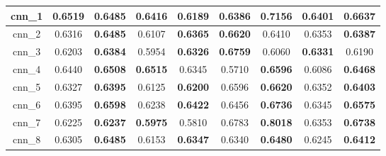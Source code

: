 \begin{table}[hp]
\begin{tabular} {|c|c|c|c|c|c|c|c|c| }
        cnn\_1   & \textbf{0.6519}                     & 0.6485                              & \textbf{0.6416}                     & 0.6189                              & 0.6386                              & \textbf{0.7156}                     & 0.6401                              & \textbf{0.6637}                     \\ \hline
        cnn\_2   & 0.6316                              & \textbf{0.6485}                     & 0.6107                              & \textbf{0.6365}                     & \textbf{0.6620}                     & 0.6410                              & 0.6353                              & \textbf{0.6387}                     \\ \hline
        cnn\_3   & 0.6203                              & \textbf{0.6384}                     & 0.5954                              & \textbf{0.6326}                     & \textbf{0.6759}                     & 0.6060                              & \textbf{0.6331}                     & 0.6190                              \\ \hline
        cnn\_4   & 0.6440                              & \textbf{0.6508}                     & \textbf{0.6515}                     & 0.6345                              & 0.5710                              & \textbf{0.6596}                     & 0.6086                              & \textbf{0.6468}                     \\ \hline
        cnn\_5   & 0.6327                              & \textbf{0.6395}                     & 0.6125                              & \textbf{0.6200}                     & 0.6596                              & \textbf{0.6620}                     & 0.6352                              & \textbf{0.6403}                     \\ \hline
        cnn\_6   & 0.6395                              & \textbf{0.6598}                     & 0.6238                              & \textbf{0.6422}                     & 0.6456                              & \textbf{0.6736}                     & 0.6345                              & \textbf{0.6575}                     \\ \hline
        cnn\_7   & 0.6225                              & \textbf{0.6237}                     & \textbf{0.5975}                     & 0.5810                              & 0.6783                              & \textbf{\cellcolor{green!50}0.8018} & 0.6353                              & \textbf{0.6738}                     \\ \hline
        cnn\_8   & 0.6305                              & \textbf{0.6485}                     & 0.6153                              & \textbf{0.6347}                     & 0.6340                              & \textbf{0.6480}                     & 0.6245                              & \textbf{0.6412}                     \\ \hline

\end{tabular}
\end{table}
